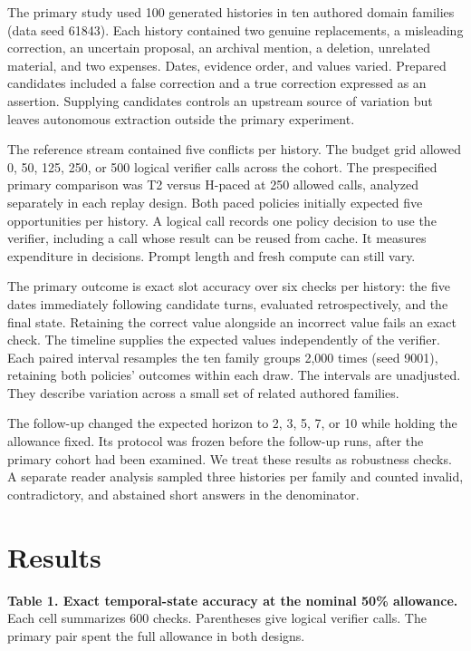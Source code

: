 \documentclass[
  11pt,
]{article}
\begin{document}
The primary study used 100 generated histories in ten authored domain
families (data seed 61843). Each history contained two genuine
replacements, a misleading correction, an uncertain proposal, an
archival mention, a deletion, unrelated material, and two expenses.
Dates, evidence order, and values varied. Prepared candidates included a
false correction and a true correction expressed as an assertion.
Supplying candidates controls an upstream source of variation but leaves
autonomous extraction outside the primary experiment.

The reference stream contained five conflicts per history. The budget
grid allowed 0, 50, 125, 250, or 500 logical verifier calls across the
cohort. The prespecified primary comparison was T2 versus H-paced at 250
allowed calls, analyzed separately in each replay design. Both paced
policies initially expected five opportunities per history. A logical
call records one policy decision to use the verifier, including a call
whose result can be reused from cache. It measures expenditure in
decisions. Prompt length and fresh compute can still vary.

The primary outcome is exact slot accuracy over six checks per history:
the five dates immediately following candidate turns, evaluated
retrospectively, and the final state. Retaining the correct value
alongside an incorrect value fails an exact check. The timeline supplies
the expected values independently of the verifier. Each paired interval
resamples the ten family groups 2,000 times (seed 9001), retaining both
policies' outcomes within each draw. The intervals are unadjusted. They
describe variation across a small set of related authored families.

The follow-up changed the expected horizon to 2, 3, 5, 7, or 10 while
holding the allowance fixed. Its protocol was frozen before the
follow-up runs, after the primary cohort had been examined. We treat
these results as robustness checks. A separate reader analysis sampled
three histories per family and counted invalid, contradictory, and
abstained short answers in the denominator.

\section{Results}\label{results}

\textbf{Table 1. Exact temporal-state accuracy at the nominal 50\%
allowance.} Each cell summarizes 600 checks. Parentheses give logical
verifier calls. The primary pair spent the full allowance in both
designs.
\end{document}
